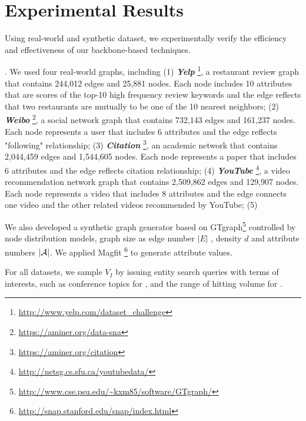 \section {Experimental Results}
\label{sec-exp}

Using real-world and synthetic dataset, we experimentally verify the efficiency and effectiveness of our backbone-based techniques. %

. We used four real-world graphs, including (1) \textbf{{\em Yelp}} \footnote{\scriptsize\url{ http://www.yelp.com/dataset_challenge}}, a restaurant review graph that contains 244,012 edges and 25,881 nodes. Each node includes 10 attributes that are scores of the top-10 high frequency review keywords and the edge reflects that two restaurants are mutually to be one of the 10 nearest neighbors; (2) \textbf{{\em Weibo}} \footnote{\scriptsize\url{https://aminer.org/data-sna}}, a social network graph that contains 732,143 edges and 161,237 nodes. Each node represents a user that includes 6 attributes and the edge reflects "following" relationship; (3) \textbf{{\em Citation}}  \footnote{\scriptsize\url{https://aminer.org/citation}}, an academic network that contains 2,044,459 edges and 1,544,605 nodes. Each node represents a paper that includes 6 attributes and the edge reflects citation relationship; (4) \textbf{{\em YouTube}}  \footnote{\scriptsize\url{http://netsg.cs.sfu.ca/youtubedata/}}, a video recommendation network graph that contains 2,509,862 edges and 129,907 nodes. Each node represents a video that includes 8 attributes and the edge connects one video and the other related videos recommended by YouTube; (5)

We also developed a synthetic graph generator
based on GTgraph\footnote{\scriptsize\url{http://www.cse.psu.edu/~kxm85/software/GTgraph/}}
controlled by node distribution models,
graph size as edge number $|E|$ ,
density $d$ and attribute numbers $|\A|$. We applied Magfit \footnote{\scriptsize\url{http://snap.stanford.edu/snap/index.html}} to generate  attribute values.

\vspace{.5ex}
For all datasets, we
sample $V_I$ by issuing
entity search queries with terms
of interests, such as conference topics for \cita,
and the range of hitting volume for \youtube.

